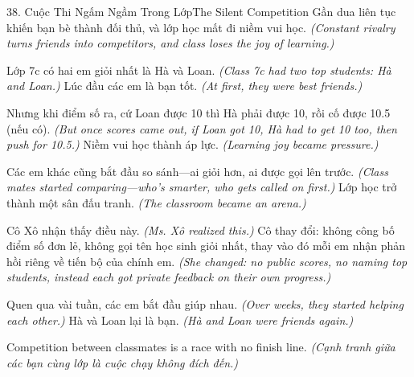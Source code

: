 \begin{truyen}{38. Cuộc Thi Ngấm Ngầm Trong Lớp}{The Silent Competition}
Gần dua liên tục khiến bạn bè thành đối thủ, và lớp học mất đi niềm vui học.
\textit{(Constant rivalry turns friends into competitors, and class loses the joy of learning.)}

Lớp 7c có hai em giỏi nhất là Hà và Loan.
\textit{(Class 7c had two top students: Hà and Loan.)}
Lúc đầu các em là bạn tốt.
\textit{(At first, they were best friends.)}

Nhưng khi điểm số ra, cứ Loan được 10 thì Hà phải được 10, rồi cố được 10.5 (nếu có).
\textit{(But once scores came out, if Loan got 10, Hà had to get 10 too, then push for 10.5.)}
Niềm vui học thành áp lực.
\textit{(Learning joy became pressure.)}

Các em khác cũng bắt đầu so sánh—ai giỏi hơn, ai được gọi lên trước.
\textit{(Class mates started comparing—who's smarter, who gets called on first.)}
Lớp học trở thành một sân đấu tranh.
\textit{(The classroom became an arena.)}

Cô Xô nhận thấy điều này.
\textit{(Ms. Xô realized this.)}
Cô thay đổi: không công bố điểm số đơn lẻ, không gọi tên học sinh giỏi nhất, thay vào đó mỗi em nhận phản hồi riêng về tiến bộ của chính em.
\textit{(She changed: no public scores, no naming top students, instead each got private feedback on their own progress.)}

Quen qua vài tuần, các em bắt đầu giúp nhau.
\textit{(Over weeks, they started helping each other.)}
Hà và Loan lại là bạn.
\textit{(Hà and Loan were friends again.)}
\end{truyen}

\begin{baihoc}
Competition between classmates is a race with no finish line.
\textit{(Cạnh tranh giữa các bạn cùng lớp là cuộc chạy không đích đến.)}
\end{baihoc}

